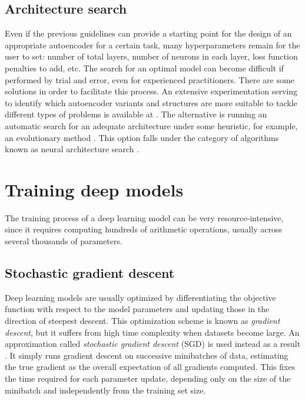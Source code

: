\subsection{Architecture search}

Even if the previous guidelines can provide a starting point for the design of an appropriate autoencoder for a certain task, many hyperparameters remain for the user to set: number of total layers, number of neurons in each layer, loss function penalties to add, etc. The search for an optimal model can become difficult if performed by trial and error, even for experienced practitioners. There are some solutions in order to facilitate this process. An extensive experimentation serving to identify which autoencoder variants and structures are more suitable to tackle different types of problems is available at . The alternative is running an automatic search for an adequate architecture under some heuristic, for example, an evolutionary method . This option falls under the category of algorithms known as neural architecture search .


\section{Training deep models}

The training process of a deep learning model can be very resource-intensive, since it requires computing hundreds of arithmetic operations, usually across several thousands of parameters. 

\subsection{Stochastic gradient descent}

Deep learning models are usually optimized by differentiating the objective function with respect to the model parameters and updating those in the direction of steepest descent. This optimization scheme is known as \textit{gradient descent}, but it suffers from high time complexity when datasets become large. An approximation called \textit{stochastic gradient descent} (SGD) is used instead as a result . It simply runs gradient descent on successive minibatches of data, estimating the true gradient as the overall expectation of all gradients computed. This fixes the time required for each parameter update, depending only on the size of the minibatch and independently from the training set size.

